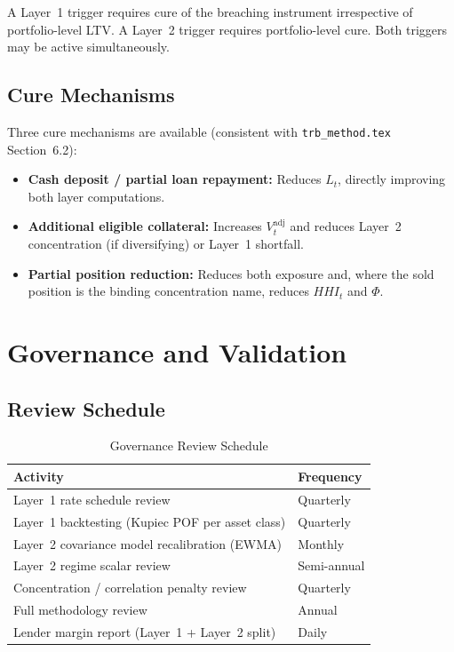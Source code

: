\documentclass[12pt, a4paper]{article}
\begin{document}
\noindent A Layer~1 trigger requires cure of the breaching instrument
irrespective of portfolio-level LTV. A Layer~2 trigger requires
portfolio-level cure. Both triggers may be active simultaneously.

\subsection{Cure Mechanisms}

Three cure mechanisms are available (consistent with \texttt{trb\_method.tex}
Section~6.2):
\begin{itemize}[leftmargin=1.5em]
    \item \textbf{Cash deposit / partial loan repayment:} Reduces $L_t$,
    directly improving both layer computations.
    \item \textbf{Additional eligible collateral:} Increases $V_t^{\mathrm{adj}}$
    and reduces Layer~2 concentration (if diversifying) or Layer~1 shortfall.
    \item \textbf{Partial position reduction:} Reduces both exposure and,
    where the sold position is the binding concentration name, reduces
    $HHI_t$ and $\Phi$.
\end{itemize}

\section{Governance and Validation}
\label{sec:governance}

\subsection{Review Schedule}

\begin{table}[H]
\centering
\caption{Governance Review Schedule}
\begin{tabular}{ll}
\toprule
\textbf{Activity} & \textbf{Frequency} \\
\midrule
Layer~1 rate schedule review                     & Quarterly \\
Layer~1 backtesting (Kupiec POF per asset class) & Quarterly \\
Layer~2 covariance model recalibration (EWMA)    & Monthly \\
Layer~2 regime scalar review                     & Semi-annual \\
Concentration / correlation penalty review       & Quarterly \\
Full methodology review                          & Annual \\
Lender margin report (Layer~1 + Layer~2 split)   & Daily \\
\bottomrule
\end{tabular}
\end{table}
\end{document}
